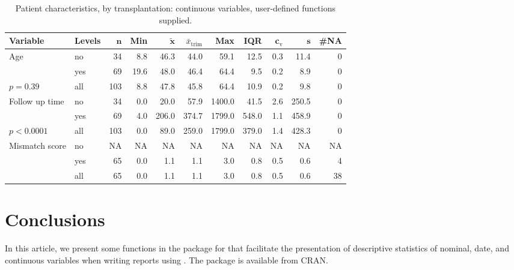\documentclass[nojss]{jss}\usepackage[]{graphicx}\usepackage[]{color}
\begin{document}
\renewcommand{\baselinestretch}{1.15}
\begin{center}
\begin{table}[ht]
\centering
{\footnotesize
\begin{tabular}{llrrrrrrrrr}
 \textbf{Variable} & \textbf{Levels} & $\mathbf{n}$ & \textbf{Min} & $\mathbf{\widetilde{x}}$ & $\bar{x}_{\mathrm{trim}}$ & \textbf{Max} & \textbf{IQR} & c$_{\mathrm{v}}$ & $\mathbf{s}$ & \textbf{\#NA} \\ 
  \hline
Age & no &  34 &  8.8 &  46.3 &  44.0 &   59.1 &  12.5 & 0.3 &  11.4 &  0 \\ 
   & yes &  69 & 19.6 &  48.0 &  46.4 &   64.4 &   9.5 & 0.2 &   8.9 &  0 \\ 
   \hline
$p= 0.39$ & all & 103 &  8.8 &  47.8 &  45.8 &   64.4 &  10.9 & 0.2 &   9.8 &  0 \\ 
   \hline
Follow up time & no &  34 &  0.0 &  20.0 &  57.9 & 1400.0 &  41.5 & 2.6 & 250.5 &  0 \\ 
   & yes &  69 &  4.0 & 206.0 & 374.7 & 1799.0 & 548.0 & 1.1 & 458.9 &  0 \\ 
   \hline
$p< 0.0001$ & all & 103 &  0.0 &  89.0 & 259.0 & 1799.0 & 379.0 & 1.4 & 428.3 &  0 \\ 
   \hline
Mismatch score & no &  NA &   NA &    NA &    NA &     NA &    NA &  NA &    NA & NA \\ 
   & yes &  65 &  0.0 &   1.1 &   1.1 &    3.0 &   0.8 & 0.5 &   0.6 &  4 \\ 
   \hline
 & all &  65 &  0.0 &   1.1 &   1.1 &    3.0 &   0.8 & 0.5 &   0.6 & 38 \\ 
   \hline
\end{tabular}
}
\caption{Patient characteristics, by transplantation: continuous variables, user-defined functions supplied.} 
\label{tab: cont2}
\end{table}

\end{center}
\renewcommand{\baselinestretch}{1}

\section{Conclusions} \label{sec: concl}
In this article, we present some functions in the  package for  
that facilitate the presentation of descriptive statistics of nominal, date, and continuous variables
when writing reports using . The package is available from CRAN.
\end{document}
